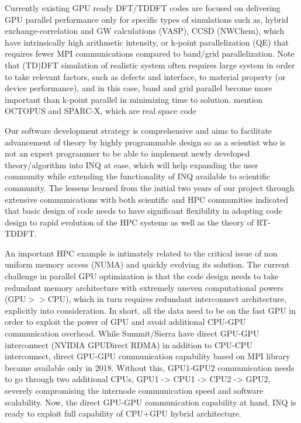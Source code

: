 Currently existing GPU ready DFT/TDDFT codes are focused on delivering GPU parallel performance only for specific types of simulations such as, hybrid exchange-correlation and GW calculations (VASP), CCSD (NWChem), which have intrinsically high arithmetic intensity, or k-point parallelization (QE) that requires  fewer MPI communications compared to band/grid parallelization. Note that (TD)DFT simulation of realistic system often requires large system in order to take relevant factors, such as defects and interface, to material property (or device performance), and in this case, band and grid parallel become more important than k-point parallel in minimizing time to solution. {\color{red} mention OCTOPUS and SPARC-X, which are real space code}

Our software development strategy is comprehensive and aims to facilitate advancement of theory by highly programmable design so as a scientist who is not an expert programmer to be able to implement newly developed theory/algorithm into INQ at ease, which will help expanding the user community while extending the functionality of INQ available to scientific community. The lessens learned from the initial two years of our project through extensive communications with both scientific and HPC communities indicated that basic design of code needs to have significant flexibility in adopting code design to rapid evolution of the HPC systems as well as the theory of RT-TDDFT. 

An important HPC example is intimately related to the critical issue of non uniform memory access (NUMA) and quickly evolving its solution. The current challenge in parallel GPU optimization is that the code design needs to take redundant memory architecture with extremely uneven computational powers (GPU$>>$CPU), which in turn requires redundant interconnect architecture, explicitly into consideration. In short, all the data need to be on the fast GPU in order to exploit the power of GPU and avoid additional CPU-GPU communication overhead. While Summit/Sierra have direct GPU-GPU interconnect (NVIDIA GPUDirect RDMA) in addition to CPU-CPU interconnect, direct GPU-GPU communication capability based on MPI library became available only in 2018. Without this, GPU1-GPU2 communication needs to go through two additional CPUs, GPU1 -> CPU1 -> CPU2 -> GPU2, severely compromising the internode communication speed and software scalability. Now, the direct GPU-GPU communication capability at hand, INQ is ready to exploit full capability of CPU+GPU hybrid architecture.

